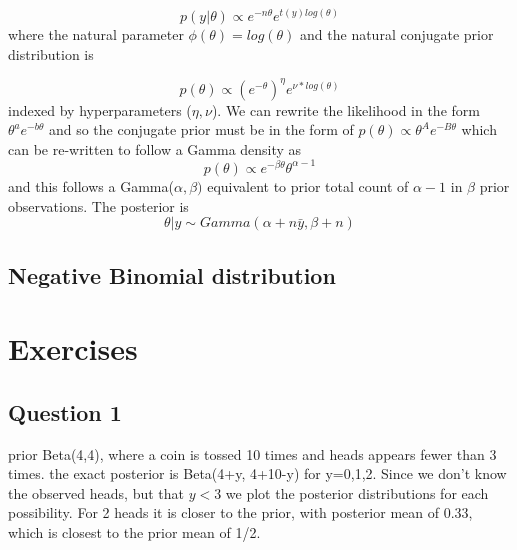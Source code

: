\documentclass[
]{book}
\theoremstyle{definition}
\theoremstyle{definition}
\theoremstyle{definition}
\theoremstyle{definition}
\theoremstyle{remark}
\begin{document}
\[
p(y|\theta)\propto e^{-n\theta}e^{t(y)log(\theta)}
\]
where the natural parameter \(\phi(\theta)=log(\theta)\) and the natural conjugate prior distribution is

\[
p(\theta)\propto (e^{-\theta})^{\eta}e^{\nu *log(\theta)}
\]
indexed by hyperparameters (\(\eta,\nu\)). We can rewrite the likelihood in the form \(\theta^a e^{-b\theta}\) and so the conjugate prior must be in the form of \(p(\theta)\propto \theta^Ae^{-B\theta}\) which can be re-written to follow a Gamma density as
\[
p(\theta)\propto e^{-\beta\theta}\theta^{\alpha-1}
\]
and this follows a Gamma(\(\alpha,\beta)\) equivalent to prior total count of \(\alpha-1\) in \(\beta\) prior observations. The posterior is
\[
\theta|y \sim Gamma(\alpha+n\bar{y}, \beta+n)
\]

\hypertarget{negative-binomial-distribution}{%
\subsection*{Negative Binomial distribution}\label{negative-binomial-distribution}}

\hypertarget{exercises-1}{%
\section{Exercises}\label{exercises-1}}

\hypertarget{question-1}{%
\subsection*{Question 1}\label{question-1}}

prior Beta(4,4), where a coin is tossed 10 times and heads appears fewer than 3 times. the exact posterior is Beta(4+y, 4+10-y) for y=0,1,2. Since we don't know the observed heads, but that \(y<3\) we plot the posterior distributions for each possibility. For 2 heads it is closer to the prior, with posterior mean of 0.33, which is closest to the prior mean of 1/2.
\end{document}
